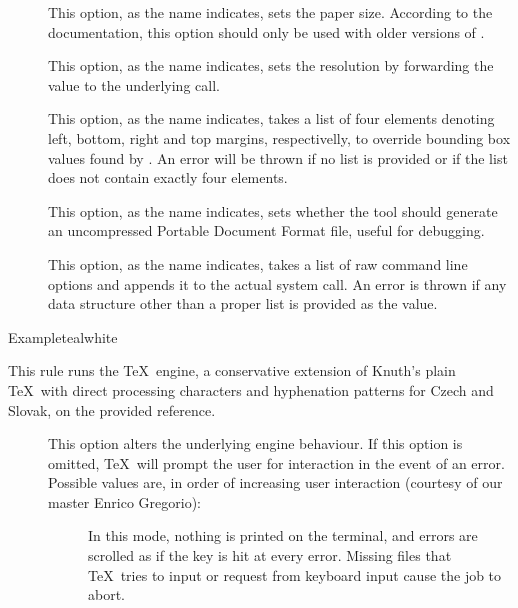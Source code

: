 \begin{description}
\begin{description}
\item[] This option, as the name indicates, sets the paper size. According to the documentation, this option should only be used with older versions of .

\item[] This option, as the name indicates, sets the resolution by forwarding the value to the underlying  call.

\item[] This option, as the name indicates, takes a list of four elements denoting left, bottom, right and top margins, respectivelly, to override bounding box values found by . An error will be thrown if no list is provided or if the list does not contain exactly four elements.

\item[] This option, as the name indicates, sets whether the tool should generate an uncompressed Portable Document Format file, useful for debugging.

\item[] This option, as the name indicates, takes a list of raw command line options and appends it to the actual system call. An error is thrown if any data structure other than a proper list is provided as the value.
\end{description}

\begin{codebox}{Example}{teal}{\icnote}{white}
\end{codebox}

\item[\rulebox{pdfcsplain}]
This rule runs the  \TeX\ engine, a conservative extension of Knuth's plain \TeX\ with direct processing characters and hyphenation patterns for Czech and Slovak, on the provided  reference.

\begin{description}
\item[] This option alters the underlying engine behaviour. If this option is omitted, \TeX\ will prompt the user for interaction in the event of an error. Possible values are, in order of increasing user interaction (courtesy of our master Enrico Gregorio):

\begin{description}
\item[] In this mode, nothing is printed on the terminal, and errors are scrolled as if the  key is hit at every error. Missing files that \TeX\ tries to input or request from keyboard input cause the job to abort.


\end{description}
\end{description}
\end{description}
